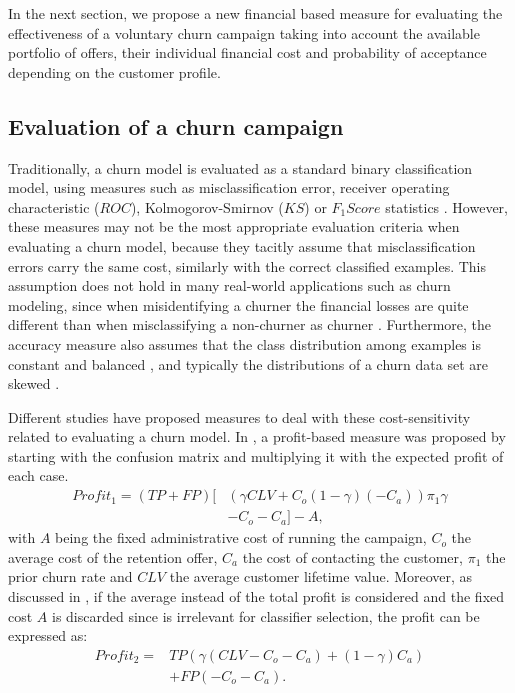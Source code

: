 In the next section, we propose a new financial based measure for evaluating the effectiveness of 
a voluntary churn campaign taking into account the available portfolio of offers, their 
individual 	financial cost and probability of acceptance depending on the customer profile. 


\subsection{Evaluation of a churn campaign}
\label{sec:4:1:evaluation}
	
Traditionally, a churn model is evaluated as a standard binary classification model, 
using measures such as misclassification error, receiver operating characteristic ($ROC$),  
Kolmogorov-Smirnov ($KS$) or \mbox{$F_1Score$} statistics \citep{Verbeke2012}.
However, these measures may not be the most appropriate evaluation criteria when  
evaluating a churn model, because they tacitly assume that misclassification errors carry the 
same cost, similarly with the correct classified examples. This assumption does not hold in many 
real-world applications such as churn modeling, since  when misidentifying a churner the financial 
losses are quite different than when misclassifying a non-churner as churner \citep{Glady2009}. 
Furthermore, the accuracy measure also assumes that the class distribution 
among examples is constant and balanced \citep{Provost1998}, and typically the distributions of a 
churn data set are skewed \citep{Verbeke2012}.

Different studies have proposed measures to deal with these cost-sensitivity related to
evaluating a churn model. In \citep{Neslin2006}, a profit-based measure was proposed by starting 
with the confusion matrix and multiplying it with the expected profit of each case.
\begin{align}\label{eq:4:profit1}
 Profit_1 = (TP+FP)\bigg[ & \left(\gamma CLV + C_o(1-\gamma)(-C_a)\right)\pi_1\gamma \nonumber \\
 & -C_o-C_a\bigg]-A,
\end{align}
with $A$ being the fixed administrative cost of running the campaign, $C_o$ the average cost of the 
retention offer, $C_a$ the cost of contacting the customer, $\pi_1$ the prior churn rate and $CLV$ 
the average customer lifetime value.
Moreover, as discussed in \citep{Verbraken2013}, if the average instead of the total profit is 
considered and the fixed cost $A$ is discarded since is irrelevant for classifier selection, the 
profit can be expressed as:
\begin{align}\label{eq:4:profit2}
 Profit_2 = &TP\left(\gamma(CLV-C_o-C_a)+(1-\gamma)C_a \right) \nonumber \\
 &+FP(-C_o-C_a).
\end{align}

